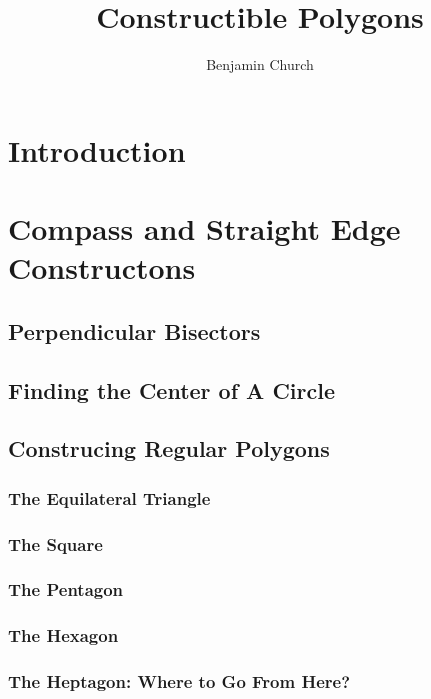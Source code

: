 \documentclass[11pt,a4paper]{article}
\theoremstyle{theorem}
\theoremstyle{definition}
\theoremstyle{definition}
\theoremstyle{remark}
\theoremstyle{definition}
\theoremstyle{remark}
\begin{document}
\author{Benjamin Church}
\title{\Huge Constructible Polygons}

\maketitle
\tableofcontents
\newpage


\section{Introduction}

\section{Compass and Straight Edge Constructons}

\subsection{Perpendicular Bisectors}

\subsection{Finding the Center of A Circle}

\subsection{Construcing Regular Polygons}

\subsubsection{The Equilateral Triangle}

\subsubsection{The Square}

\subsubsection{The Pentagon}

\subsubsection{The Hexagon}

\subsubsection{The Heptagon: Where to Go From Here?}
\end{document}
